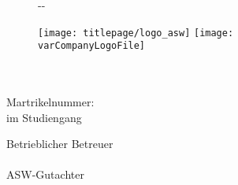 \makeatletter
\begin{titlepage}
    \begin{figure}[t]
        \begin{adjustwidth}{-\oddsidemargin-1in}{-\rightmargin}
            
            \minipage{0pt}
              \noindent
            \endminipage
            
            \vspace*{10mm}
            \minipage{0.1\paperwidth}
              \hfill
            \endminipage
            \minipage{0.25\paperwidth}
              \texttt{[image: titlepage/logo\_asw]}
            \endminipage
            \minipage{0.3\paperwidth}
                \hfill
            \endminipage
            \minipage{0.25\paperwidth}
                \ifdefined\varCompanyLogoFile
                  \texttt{[image: \\varCompanyLogoFile]}
                \else
                  \hfill
                \fi
            \endminipage

        \end{adjustwidth}
    \end{figure}

    \vspace*{2cm}

    \begin{flushleft}
        \Huge
        \textbf{\@title}\\[2cm]

        \LARGE
        {\@author}\\[0.5cm]

        \large
        Martrikelnummer: \varMartrikelnummer \\[0.5cm]

        \Large
        \varArbeit{} im Studiengang\\
        \varStudiengang
    \end{flushleft}

    \vspace{0.5cm}

    \begin{flushright}
        Betrieblicher Betreuer\\
        \varBetrBetreuer\\[0.5cm]

        ASW-Gutachter\\
        \varASWGutachter\\[0.5cm]


\end{flushright}
\end{titlepage}
